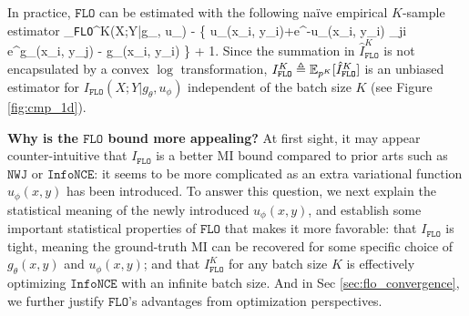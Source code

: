 \documentclass{article}
\theoremstyle{plain}
\theoremstyle{definition}
\theoremstyle{remark}
\newcommand{\infonce}{\texttt{InfoNCE}}
\newcommand{\NWJ}{\texttt{NWJ}}
\newcommand{\FLO}{\texttt{FLO}}
\begin{document}
			
			In practice, $\FLO$ can be estimated with the following na\"ive empirical $K$-sample estimator
			\beq
			_{\FLO}^K(X;Y|g_{\theta}, u_{\phi}) \triangleq - \left\{ u_{\phi}(x_i, y_i)+e^{-u_{\phi}(x_i, y_i)}  \sum_{j\neq i} e^{g_{\theta}(x_i, y_j) - g_{\theta}(x_i, y_i)} \right\} + 1.
			\eeq
			Since the summation in $\hat{I}_{\FLO}^K$ is not encapsulated by a convex $\log$ transformation, $I_{\FLO}^K \triangleq \EE_{p^K}[\hat{I}_{\FLO}^K]$ is an unbiased estimator for $I_{\FLO}(X;Y|g_{\theta}, u_{\phi})$ independent of the batch size $K$ (see Figure \ref{fig:cmp_1d}).
			
			
		
		{\bf Why is the $\FLO$ bound more appealing?} At first sight, it may appear counter-intuitive that $I_{\FLO}$ is a better MI bound compared to prior arts such as $\NWJ$ or $\infonce$: it seems to be more complicated as an extra variational function $u_{\phi}(x,y)$ has been introduced. To answer this question, we next explain the statistical meaning of the newly introduced $u_{\phi}(x,y)$, and establish some important statistical properties of $\FLO$ that makes it more favorable: that $I_{\FLO}$ is tight, meaning the ground-truth MI can be recovered for some specific choice of $g_{\theta}(x, y)$ and $u_{\phi}(x, y)$; and that $I_{\FLO}^K$ for any batch size $K$ is effectively optimizing $\infonce$ with an infinite batch size. And in Sec \ref{sec:flo_convergence}, we further justify $\FLO$'s advantages from optimization perspectives. 
		
\end{document}
